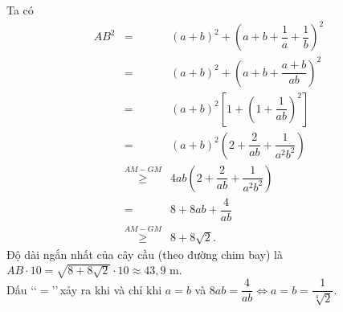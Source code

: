 \begin{bt}
{		Ta  có
		\allowdisplaybreaks 
		\begin{eqnarray*}
			AB^2&=&(a+b)^2+\left(a+b+\dfrac{1}{a}+\dfrac{1}{b}\right)^2\\ 
			 &=&(a+b)^2+\left(a+b+\dfrac{a+b}{ab}\right)^2\\
			 &=&(a+b)^2\left[1+\left(1+\dfrac{1}{ab}\right)^2\right]\\
			&=&(a+b)^2\left(2+\dfrac{2}{ab}+\dfrac{1}{a^2  b^2}\right)\\ &\stackrel{A M-G M}{\ge}& 4 a b\left(2+\dfrac{2}{ab}+\dfrac{1}{a^2 b^2}\right)\\
			 &=&8+8 a b+\dfrac{4}{ab}\\
			 &\stackrel{A M-G M}{\ge}& 8+8 \sqrt{2}.
		\end{eqnarray*}
		Độ dài ngắn  nhất của cây cầu (theo đường chim bay) là $AB\cdot 10=\sqrt{8+8\sqrt{2}}\cdot 10\approx 43{,}9$ m.\\
		 Dấu \lq\lq$=$\rq\rq\,xảy ra khi và chỉ khi $a=b$ và $8a b=\dfrac{4}{ab}\Leftrightarrow a=b=\dfrac{1}{\sqrt[4]{2}}$.
	} 
\end{bt}


